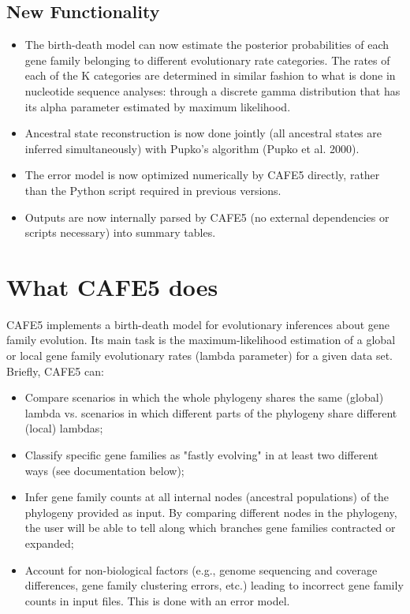 \documentclass{article}
\newcommand{\shortname}{CAFE5 }
\begin{document}
\subsection{New Functionality}
\begin{itemize}
\item{The birth-death model can now estimate the posterior probabilities of each gene family belonging to different evolutionary rate categories. The rates of each of the K categories are determined in similar fashion to what is done in nucleotide sequence analyses: through a discrete gamma distribution that has its alpha parameter estimated by maximum likelihood.}

\item{Ancestral state reconstruction is now done jointly (all ancestral states are inferred simultaneously) with Pupko's algorithm (Pupko et al. 2000).}

\item{The error model is now optimized numerically by \shortname directly, rather than the Python script required in previous versions.}

\item{Outputs are now internally parsed by \shortname (no external dependencies or scripts necessary) into summary tables.}
\end{itemize}
\section{What \shortname does}
\shortname implements a birth-death model for evolutionary inferences about gene family evolution. Its main task is the maximum-likelihood estimation of a global or local gene family evolutionary rates (lambda parameter) for a given data set. Briefly, \shortname can:

\begin{itemize}
\item Compare scenarios in which the whole phylogeny shares the same (global) lambda vs. scenarios in which different parts of the phylogeny share different (local) lambdas;

\item Classify specific gene families as "fastly evolving" in at least two different ways (see documentation below);

\item Infer gene family counts at all internal nodes (ancestral populations) of the phylogeny provided as input. By comparing different nodes in the phylogeny, the user will be able to tell along which branches gene families contracted or expanded;

\item Account for non-biological factors (e.g., genome sequencing and coverage differences, gene family clustering errors, etc.) leading to incorrect gene family counts in input files. This is done with an error model.
\end{itemize}
\end{document}
